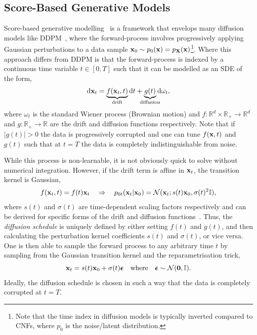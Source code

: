 \subsection{Score-Based Generative Models}
\newcommand{\score}{\nabla_{\x_t} \log p(\x_t)}
\newcommand{\cscore}{\nabla_{\x_t} \log p(\x_t|\x_0)}
\newcommand{\unitime}{\mathcal{U}(0, T)}

Score-based generative modelling~\cite{ScoreMatching, ScoreBasedGenerativeModeling} is a framework that envelops many diffusion models like DDPM~\cite{DDPM}, where the forward-process involves progressively applying Gaussian perturbations to a data sample $\mathbf{x}_0 \sim p_0(\mathbf{x}) = p_{\mathbf{X}}(\mathbf{x})$\footnote{Note that the time index in diffusion models is typically inverted compared to CNFs, where $p_0$ is the noise/latent distribution.}.
Where this approach differs from DDPM is that the forward-process is indexed by a continuous time variable $t \in [0, T]$ such that it can be modelled as an SDE of the form,
\begin{equation}
    \label{eq:sde}
    \diff \x_t = \underbrace{f(\x_t, t)}_{\mathclap{\text{drift}}} \diff t + \underbrace{g(t)}_{\mathclap{\text{diffusion}}} \diff \omega_t,
\end{equation}
where $\omega_t$ is the standard Wiener process (Brownian motion) and $f: \mathbb{R}^d \times \mathbb{R}_{+} \rightarrow \mathbb{R}^d$ and $g: \mathbb{R}_{+} \rightarrow \mathbb{R}$ are the drift and diffusion functions respectively.
Note that if $|g(t)| > 0$ the data is progressively corrupted and one can tune $f(\mathbf{x}, t)$ and $g(t)$ such that at $t = T$ the data is completely indistinguishable from noise.

While this process is non-learnable, it is not obviously quick to solve without numerical integration.
However, if the drift term is affine in $\mathbf{x}_t$, the transition kernel is Gaussian,
\begin{equation}
    \label{eq:gaussian_kernel}
    f(\mathbf{x}_t, t) = f(t)\mathbf{x}_t \quad \Rightarrow \quad p_{0t}(\mathbf{x}_t|\mathbf{x}_0) = \mathcal{N}(\mathbf{x}_t; s(t)\mathbf{x}_0, \sigma(t)^2 \mathbb{I}),
\end{equation}
where $s(t)$ and $\sigma(t)$ are time-dependent scaling factors respectively and can be derived for specific forms of the drift and diffusion functions~\cite{sarkka2019applied}.
Thus, the \textit{diffusion schedule} is uniquely defined by either setting $f(t)$ and $g(t)$, and then calculating the perturbation kernel coefficients $s(t)$ and $\sigma(t)$, or vice versa.
One is then able to sample the forward process to any arbitrary time $t$ by sampling from the Gaussian transition kernel and the reparametrisation trick,
\begin{equation}
    \mathbf{x}_t = s(t)\mathbf{x}_0 + \sigma(t) \boldsymbol{\epsilon} \quad \text{where} \quad \boldsymbol{\epsilon} \sim \mathcal{N}(\mathbf{0}, \mathbb{I}).
\end{equation}
Ideally, the diffusion schedule is chosen in such a way that the data is completely corrupted at $t = T$.


